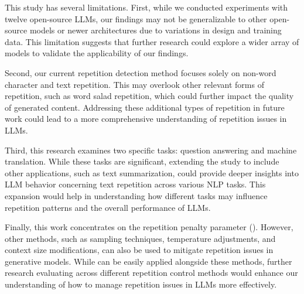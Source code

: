 This study has several limitations. First, while we conducted experiments with twelve open-source LLMs, our findings may not be generalizable to other open-source models or newer architectures due to variations in design and training data. This limitation suggests that further research could explore a wider array of models to validate the applicability of our findings.

Second, our current repetition detection method focuses solely on non-word character and text repetition. This may overlook other relevant forms of repetition, such as word salad repetition, which could further impact the quality of generated content. Addressing these additional types of repetition in future work could lead to a more comprehensive understanding of repetition issues in LLMs.

Third, this research examines two specific tasks: question answering and machine translation. While these tasks are significant, extending the study to include other applications, such as text summarization, could provide deeper insights into LLM behavior concerning text repetition across various NLP tasks. This expansion would help in understanding how different tasks may influence repetition patterns and the overall performance of LLMs.

Finally, this work concentrates on the repetition penalty parameter (\rpp). However, other methods, such as sampling techniques, temperature adjustments, and context size modifications, can also be used to mitigate repetition issues in generative models. While \rap can be easily applied alongside these methods, further research evaluating \rap across different repetition control methods would enhance our understanding of how to manage repetition issues in LLMs more effectively.


